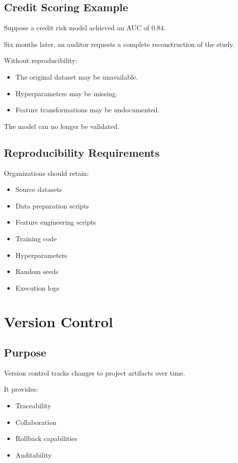 \subsection{Credit Scoring Example}

Suppose a credit risk model achieved an AUC of 0.84.

Six months later, an auditor requests a complete reconstruction of the study.

Without reproducibility:

\begin{itemize}
    \item The original dataset may be unavailable.
    \item Hyperparameters may be missing.
    \item Feature transformations may be undocumented.
\end{itemize}

The model can no longer be validated.

\subsection{Reproducibility Requirements}

Organizations should retain:

\begin{itemize}
    \item Source datasets
    \item Data preparation scripts
    \item Feature engineering scripts
    \item Training code
    \item Hyperparameters
    \item Random seeds
    \item Execution logs
\end{itemize}

\section{Version Control}

\subsection{Purpose}

Version control tracks changes to project artifacts over time.

It provides:

\begin{itemize}
    \item Traceability
    \item Collaboration
    \item Rollback capabilities
    \item Auditability
\end{itemize}

